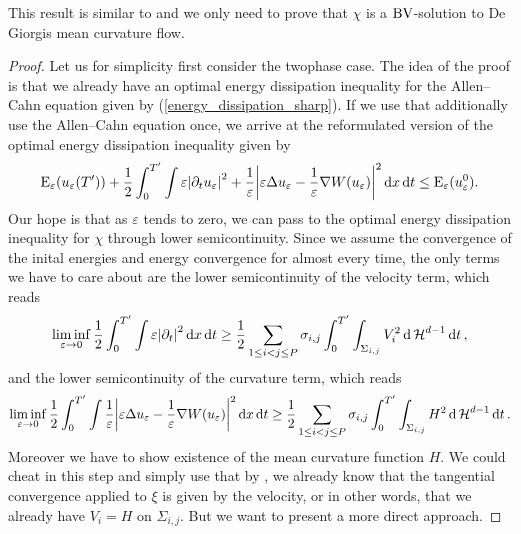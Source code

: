 This result is similar to  and we only need 
to prove that $ \chi $ is a $ \operatorname{BV} $-solution to De Giorgis mean curvature flow.

\begin{proof}
	Let us for simplicity first consider the twophase case. The idea of the 
	proof is that we already have an optimal energy dissipation inequality for 
	the Allen--Cahn equation given by (\ref{energy_dissipation_sharp}).
	If we use that additionally use the Allen--Cahn equation once, we arrive at 
	the reformulated version of the optimal energy dissipation inequality given 
	by
	\begin{equation*}
	\label{energy_dissipation_sharp_with_curvature}
	\operatorname{E}_{ \varepsilon } ( u_{ \varepsilon } ( T' ) )
	+
	\frac{ 1 }{ 2 }
	\int_{ 0 }^{ T' }
		\int
			\varepsilon \abs{ \partial_{ t } u_{ \varepsilon } }^{ 2 }
			+
			\frac{ 1 }{ \varepsilon }
			\abs{
				\varepsilon \Delta u_{ \varepsilon } 
				-
				\frac{ 1 }{ \varepsilon } \nabla W ( u_{ \varepsilon } )
			}^{ 2 }
		\dd{ x }
	\dd{ t }
	\leq
	\operatorname{E}_{ \varepsilon } ( u_{ \varepsilon}^{ 0 } ).
	\end{equation*}
	Our hope is that as $ \varepsilon $ tends to zero, we can pass to the 
	optimal energy dissipation inequality for $ \chi $ through lower 
	semicontinuity. 
	Since we assume the convergence of the inital energies and energy 
	convergence for almost every time, the only terms we have to care about are 
	the lower semicontinuity of the velocity term, which reads
	\begin{equation}
		\label{lsc_of_velocity}
		\liminf_{ \varepsilon \to 0 }
			\frac{ 1 }{ 2 }
			\int_{ 0 }^{ T' }
				\int
					\varepsilon 
					\abs{ \partial_{ t } }^{ 2 }
				\dd{ x }
			\dd{ t }
		\geq
		\frac{ 1 }{ 2 }
		\sum_{ 1 \leq i < j \leq P }
			\sigma_{ i , j }
			\int_{ 0 }^{ T' }
				\int_{ \Sigma_{ i , j } }
					V_{ i }^{ 2 }
				\dd{ \operatorname{\mathcal{H}}^{ d - 1 } }
			\dd{ t },
	\end{equation}
	and the lower semicontinuity of the curvature term, which reads
	\begin{equation}
		\label{lsc_of_curvature}
		\liminf_{ \varepsilon \to 0 }
			\frac{ 1 }{ 2 }
			\int_{ 0 }^{ T' }
				\int
					\frac{ 1 }{ \varepsilon }
					\abs{
						\varepsilon
						\Delta u_{ \varepsilon }
						-
						\frac{ 1 }{ \varepsilon }
						\nabla W ( u_{ \varepsilon } ) 
					}^{ 2 }
				\dd{ x }
			\dd{ t }
		\geq
		\frac{ 1 }{ 2 }
		\sum_{ 1 \leq i < j \leq P }
			\sigma_{ i , j }
			\int_{ 0 }^{ T' }
				\int_{ \Sigma_{ i , j } }
					H^{ 2 }
				\dd{ \operatorname{\mathcal{H}}^{ d - 1 } }
			\dd{ t }.
	\end{equation}
	Moreover we have to show existence of the mean curvature function $ H $.
	We could cheat in this step and simply use that by 
	, we already know that the tangential 
	convergence applied to $ \xi $ is given by the velocity, or in other words, 
	that we already have $ V_{ i } = H $ on $ \Sigma_{ i , j } $. But we want 
	to present a more direct approach.
	

\end{proof}
